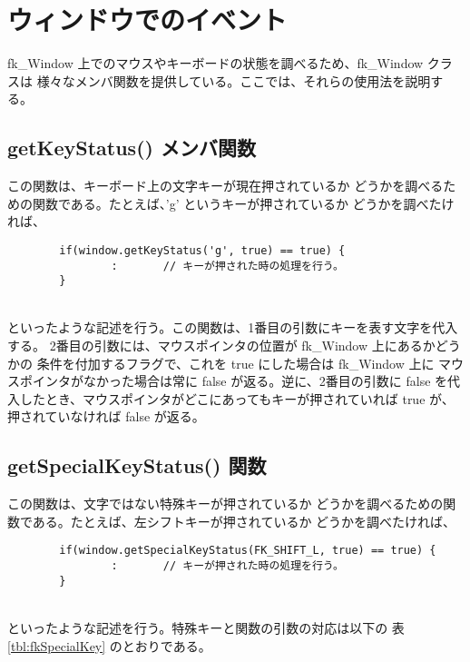\section{ウィンドウでのイベント}
fk\_Window 上でのマウスやキーボードの状態を調べるため、fk\_Window クラスは
様々なメンバ関数を提供している。ここでは、それらの使用法を説明する。
\subsection*{getKeyStatus() メンバ関数}
この関数は、キーボード上の文字キーが現在押されているか
どうかを調べるための関数である。たとえば、'g' というキーが押されているか
どうかを調べたければ、
\\
\begin{screen}
\begin{verbatim}
        if(window.getKeyStatus('g', true) == true) {
                :       // キーが押された時の処理を行う。
        }
\end{verbatim}
\end{screen}
~ \\
といったような記述を行う。この関数は、1番目の引数にキーを表す文字を代入する。
2番目の引数には、マウスポインタの位置が fk\_Window 上にあるかどうかの
条件を付加するフラグで、これを true にした場合は fk\_Window 上に
マウスポインタがなかった場合は常に false が返る。逆に、2番目の引数に
false を代入したとき、マウスポインタがどこにあってもキーが押されていれば
true が、押されていなければ false が返る。

\subsection*{getSpecialKeyStatus() 関数}
この関数は、文字ではない特殊キーが押されているか
どうかを調べるための関数である。たとえば、左シフトキーが押されているか
どうかを調べたければ、
\\
\begin{screen}
\begin{verbatim}
        if(window.getSpecialKeyStatus(FK_SHIFT_L, true) == true) {
                :       // キーが押された時の処理を行う。
        }
\end{verbatim}
\end{screen}
~ \\
といったような記述を行う。特殊キーと関数の引数の対応は以下の
表 \ref{tbl:fkSpecialKey} のとおりである。

